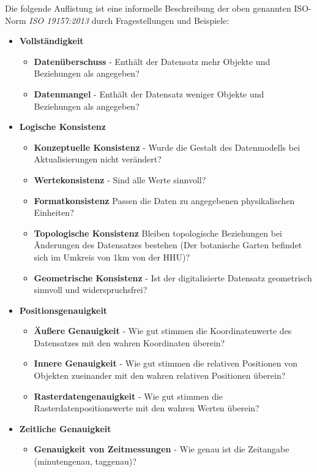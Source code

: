 \documentclass[11pt,fleqn]{book}
\begin{document}
Die folgende Auflistung ist eine informelle Beschreibung der oben genannten ISO-Norm \textit{ISO 19157:2013} durch Fragestellungen und Beispiele:

\begin{itemize}
\item \textbf{Vollständigkeit}
\begin{itemize}
\item \textbf{Datenüberschuss} -
Enthält der Datensatz mehr Objekte und Beziehungen als angegeben?
\item \textbf{Datenmangel} - Enthält der Datensatz weniger Objekte und Beziehungen als angegeben?
\end{itemize}
\item \textbf{Logische Konsistenz}
\begin{itemize}
\item \textbf{Konzeptuelle Konsistenz} - 
Wurde die Gestalt des Datenmodells bei Aktualisierungen nicht verändert?
\item \textbf{Wertekonsistenz} - Sind alle Werte sinnvoll?
\item \textbf{Formatkonsistenz} Passen die Daten zu angegebenen physikalischen Einheiten?
\item \textbf{Topologische Konsistenz} 
Bleiben topologische Beziehungen bei Änderungen des Datensatzes bestehen (Der botanische Garten befindet sich im Umkreis von 1km von der HHU)?
\item \textbf{Geometrische Konsistenz} - Ist der digitalisierte Datensatz geometrisch sinnvoll und widerspruchsfrei?
\end{itemize}
\item \textbf{Positionsgenauigkeit}
\begin{itemize}
\item
\textbf{Äußere Genauigkeit} - Wie gut stimmen die Koordinatenwerte des Datensatzes mit den wahren Koordinaten überein?
\item \textbf{Innere Genauigkeit} - Wie gut stimmen die relativen Positionen von Objekten zueinander mit den wahren relativen Positionen überein?
\item \textbf{Rasterdatengenauigkeit} - Wie gut stimmen die Rasterdatenpositionswerte mit den wahren Werten überein?
\end{itemize}
\item \textbf{Zeitliche Genauigkeit}
\begin{itemize}
\item
\textbf{Genauigkeit von Zeitmessungen} - 
Wie genau ist die Zeitangabe (minutengenau, taggenau)?

\end{itemize}
\end{itemize}
\end{document}
